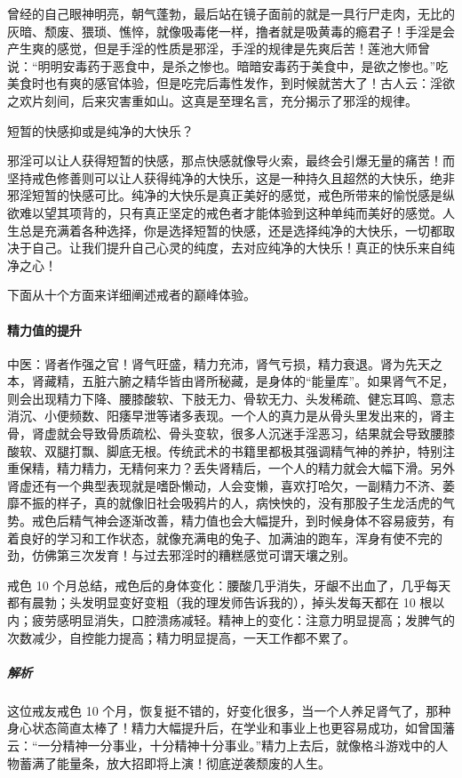 曾经的自己眼神明亮，朝气蓬勃，最后站在镜子面前的就是一具行尸走肉，无比的灰暗、颓废、猥琐、憔悴，就像吸毒佬一样，撸者就是吸黄毒的瘾君子！手淫是会产生爽的感觉，但是手淫的性质是邪淫，手淫的规律是先爽后苦！莲池大师曾说：“明明安毒药于恶食中，是杀之惨也。暗暗安毒药于美食中，是欲之惨也。”吃美食时也有爽的感官体验，但是吃完后毒性发作，到时候就苦大了！古人云：淫欲之欢片刻间，后来灾害重如山。这真是至理名言，充分揭示了邪淫的规律。

短暂的快感抑或是纯净的大快乐？

邪淫可以让人获得短暂的快感，那点快感就像导火索，最终会引爆无量的痛苦！而坚持戒色修善则可以让人获得纯净的大快乐，这是一种持久且超然的大快乐，绝非邪淫短暂的快感可比。纯净的大快乐是真正美好的感觉，戒色所带来的愉悦感是纵欲难以望其项背的，只有真正坚定的戒色者才能体验到这种单纯而美好的感觉。人生总是充满着各种选择，你是选择短暂的快感，还是选择纯净的大快乐，一切都取决于自己。让我们提升自己心灵的纯度，去对应纯净的大快乐！真正的快乐来自纯净之心！

下面从十个方面来详细阐述戒者的巅峰体验。

\paragraph{精力值的提升}

中医：肾者作强之官！肾气旺盛，精力充沛，肾气亏损，精力衰退。肾为先天之本，肾藏精，五脏六腑之精华皆由肾所秘藏，是身体的“能量库”。如果肾气不足，则会出现精力下降、腰膝酸软、下肢无力、骨软无力、头发稀疏、健忘耳鸣、意志消沉、小便频数、阳痿早泄等诸多表现。一个人的真力是从骨头里发出来的，肾主骨，肾虚就会导致骨质疏松、骨头变软，很多人沉迷手淫恶习，结果就会导致腰膝酸软、双腿打飘、脚底无根。传统武术的书籍里都极其强调精气神的养护，特别注重保精，精力精力，无精何来力？丢失肾精后，一个人的精力就会大幅下滑。另外肾虚还有一个典型表现就是嗜卧懒动，人会变懒，喜欢打哈欠，一副精力不济、萎靡不振的样子，真的就像旧社会吸鸦片的人，病怏怏的，没有那股子生龙活虎的气势。戒色后精气神会逐渐改善，精力值也会大幅提升，到时候身体不容易疲劳，有着良好的学习和工作状态，就像充满电的兔子、加满油的跑车，浑身有使不完的劲，仿佛第三次发育！与过去邪淫时的糟糕感觉可谓天壤之别。

\begin{case}
    戒色 10 个月总结，戒色后的身体变化：腰酸几乎消失，牙龈不出血了，几乎每天都有晨勃；头发明显变好变粗（我的理发师告诉我的），掉头发每天都在 10 根以内；疲劳感明显消失，口腔溃疡减轻。精神上的变化：注意力明显提高；发脾气的次数减少，自控能力提高；精力明显提高，一天工作都不累了。
    \subparagraph{解析} 这位戒友戒色 10 个月，恢复挺不错的，好变化很多，当一个人养足肾气了，那种身心状态简直太棒了！精力大幅提升后，在学业和事业上也更容易成功，如曾国藩云：“一分精神一分事业，十分精神十分事业。”精力上去后，就像格斗游戏中的人物蓄满了能量条，放大招即将上演！彻底逆袭颓废的人生。
\end{case}

